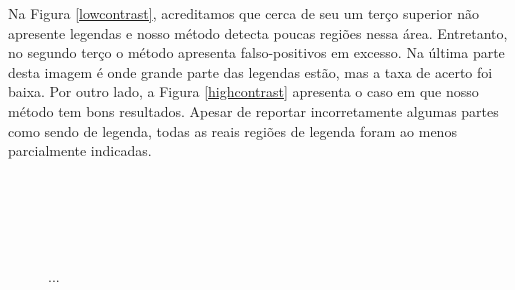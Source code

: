 \documentclass[12pt]{article}
\begin{document}
Na  Figura \ref{lowcontrast}, acreditamos  que cerca  de seu  um terço
superior não apresente legendas  e nosso método detecta poucas regiões
nessa  área.   Entretanto,  no   segundo  terço  o   método  apresenta
falso-positivos em excesso. Na última parte desta imagem é onde grande
parte das  legendas estão, mas a  taxa de acerto foi  baixa. Por outro
lado, a Figura \ref{highcontrast} apresenta o caso em que nosso método
tem bons resultados. Apesar  de reportar incorretamente algumas partes
como  sendo de legenda,  todas as  reais regiões  de legenda  foram ao
menos parcialmente indicadas. 

\begin{figure}[h!]
  \centering
  \quad
  \\
  \quad
  \\
  \quad
  \\
  \quad
  \\
  \caption{...}
\end{figure}
\end{document}

